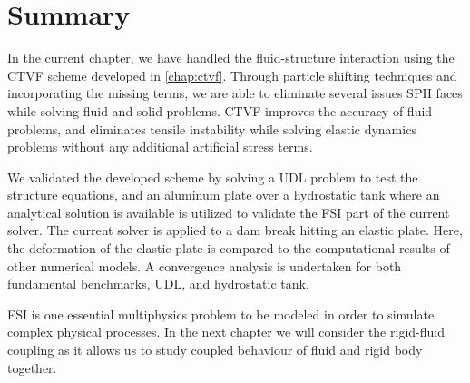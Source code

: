 \section{Summary}\label{fsi:summary}
In the current chapter, we have handled the fluid-structure interaction using
the CTVF scheme developed in \cref{chap:ctvf}. Through particle shifting
techniques and incorporating the missing terms, we are able to eliminate several
issues SPH faces while solving fluid and solid problems. CTVF improves the
accuracy of fluid problems, and eliminates tensile instability while solving
elastic dynamics problems without any additional artificial stress terms.

We validated the developed scheme by solving a UDL problem to test the structure
equations, and an aluminum plate over a hydrostatic tank where an analytical
solution is available is utilized to validate the FSI part of the current
solver. The current solver is applied to a dam break hitting an elastic plate.
Here, the deformation of the elastic plate is compared to the computational
results of other numerical models. A convergence analysis is undertaken for both fundamental benchmarks,
UDL, and hydrostatic tank.

FSI is one essential multiphysics problem to be modeled in order to simulate
complex physical processes. In the next chapter we will consider the rigid-fluid
coupling as it allows us to study coupled behaviour of fluid and rigid body
together.
